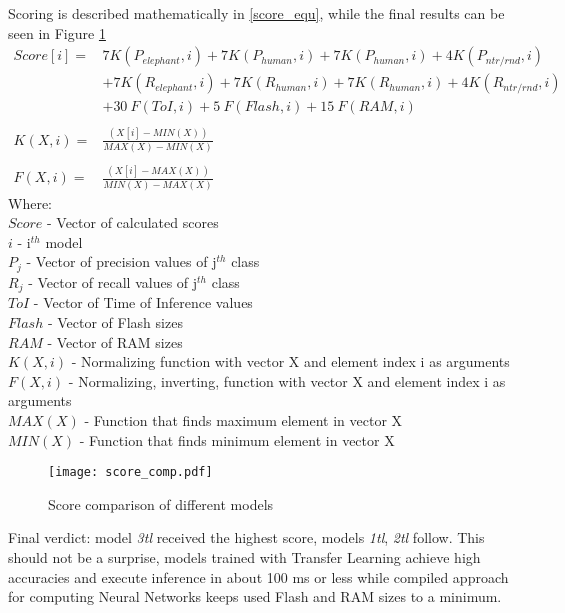 Scoring is described mathematically in \ref{score_equ}, while the final results can be seen in Figure \ref{score_comp}
\begin{equation}\label{score_equ}
    \begin{aligned}
        Score[i] ={} & 7 K(P_{elephant},i) + 7 K(P_{human},i) + 7 K(P_{human},i) + 4 K(P_{ntr/rnd},i) \\
                     & +{} 7 K(R_{elephant},i) + 7 K(R_{human},i) + 7 K(R_{human},i) + 4 K(R_{ntr/rnd},i) \\
                  & +{} 30\: F(ToI, i) +5\: F(Flash, i) + 15\: F(RAM, i)   \\
                  & \\
        K(X, i) ={}  & \frac{(X[i] - MIN(X))}{MAX(X)- MIN(X)} \\
                  & \\
        F(X, i) ={}  & \frac{(X[i] - MAX(X))}{MIN(X)- MAX(X)}
    \end{aligned}
\end{equation}
\clearpage
Where:\\
$Score$ - Vector of calculated scores\\
$i$ - i$^{th}$ model\\
$P_{j}$ - Vector of precision values of j$^{th}$ class\\
$R_{j}$ - Vector of recall values of j$^{th}$ class\\
$ToI$ - Vector of Time of Inference values\\
$Flash$ - Vector of Flash sizes\\
$RAM$ - Vector of RAM sizes\\
$K(X,i)$ - Normalizing function with vector X and element index i as arguments\\
$F(X,i)$ - Normalizing, inverting, function with vector X and element index i as arguments\\
$MAX(X)$ - Function that finds maximum element in vector X\\
$MIN(X)$ - Function that finds minimum element in vector X

\begin{figure}[ht]
    \centering
    \texttt{[image: score\_comp.pdf]}
    \caption{ Score comparison of different models}
    \label{score_comp}
\end{figure}

Final verdict: model \textit{3tl} received the highest score, models \textit{1tl}, \textit{2tl} follow.
This should not be a surprise, models trained with Transfer Learning achieve high accuracies and execute inference in about 100 ms or less while compiled approach for computing Neural Networks keeps used Flash and RAM sizes to a minimum.


